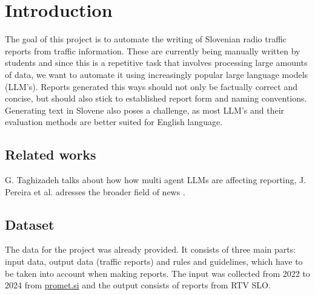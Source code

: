\documentclass[fleqn,moreauthors,10pt]{ds_report}
\affiliation{\textit{Advisors: Slavko Žitnik}}
\begin{document}
\flushbottom 

\maketitle 

\thispagestyle{empty} 


\section*{Introduction}

The goal of this project is to automate the writing of Slovenian radio traffic reports from traffic information. These are currently being manually written by students and since this is a repetitive task that involves processing large amounts of data, we want to automate it using increasingly popular large language models (LLM's).
Reports generated this ways should not only be factually correct and concise, but should also stick to established report form and naming conventions. Generating text in Slovene also poses a challenge, as most LLM's and their evaluation methods are better suited for English language.

\subsection*{Related works}
G. Taghizadeh \cite{llmReporting} talks about how how multi agent LLMs are affecting reporting, J. Pereira et al. adresses the broader field of news \cite{pereira2024generation}.

\subsection*{Dataset}
The data for the project was already provided. It consists of three main parts: input data, output data (traffic reports) and rules and guidelines, which have to be taken into account when making reports. The input was collected from 2022 to 2024 from \url{promet.si} and the output consists of reports from RTV SLO. 
\end{document}
